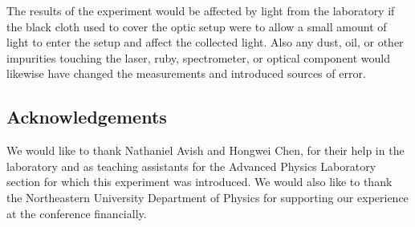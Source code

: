 \documentclass[11pt, a4paper, twocolumn]{article}
\begin{document}
The results of the experiment would be affected by light from the laboratory if the black cloth used to cover the optic setup were to allow a small amount of light to enter the setup and affect the collected light. Also any dust, oil, or other impurities touching the laser, ruby, spectrometer, or optical component would likewise have changed the measurements and introduced sources of error.

\subsection*{Acknowledgements}
We would like to thank Nathaniel Avish and Hongwei Chen, for their help in the laboratory and as teaching assistants for the Advanced Physics Laboratory section for which this experiment was introduced. We would also like to thank the Northeastern University Department of Physics for supporting our experience at the conference financially.

\nocite{*}


\end{document}
